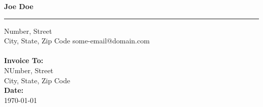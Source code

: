 \documentclass{invoice} %
\def \tab {\hspace*{3ex}} %
\begin{document}

\hfil{\Huge\bf Joe Doe}\hfil %
\bigskip\break %
\hrule %

Number, Street \hfill  \\ %
City, State, Zip Code \hfill some-email@domain.com
\\ \\
{\bf Invoice To:} \\
\tab NUmber, Street \\ %
\tab City, State, Zip Code \\ %

{\bf Date:} \\
\tab \today \\ %


\begin{invoiceTable}




\end{invoiceTable}

\end{document}
